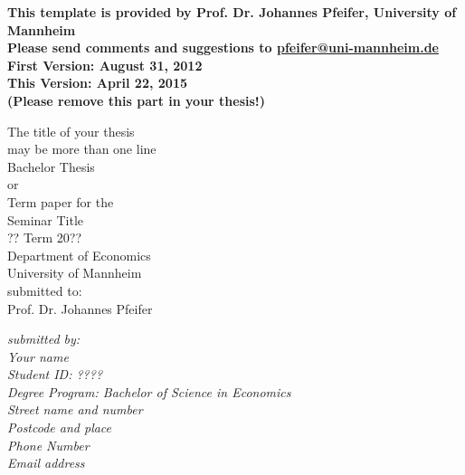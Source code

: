 \documentclass[a4paper,12pt]{scrartcl} %
\begin{document}




\begin{titlepage}

\thispagestyle{empty}   %
\begin{center}
\textbf{
This template is provided by Prof. Dr. Johannes Pfeifer, University of Mannheim\\
Please send comments and suggestions to \href{mailto:pfeifer@uni-mannheim.de}{pfeifer@uni-mannheim.de}\\
First Version: August 31, 2012\\
This Version: April 22, 2015\\
(Please remove this part in your thesis!)
}
\end{center}


\begin{center}
\vspace*{2.cm}
{\textbf  \Large The title of your thesis\\may be more than one line} \\
\vspace*{2cm}
Bachelor Thesis\\
or\\
Term paper for the \\ Seminar Title  \\ ?? Term 20??\\
\vspace{0.5cm}
Department of Economics\\
University of Mannheim\\
\vspace*{0.5cm}
submitted to:\\
Prof. Dr. Johannes Pfeifer\\
\vspace*{0.5cm}

\end{center}


\vfill
\begin{flushright}
   \emph{submitted by:} \\
   \emph{Your name} \\
   \emph{Student ID: ????}\\
    \emph{Degree Program: Bachelor of Science in Economics}\\
   \vspace*{0.5cm}
    \emph{Street name and number}\\
    \emph{Postcode and place}\\
   \emph{Phone Number}\\
   \emph{Email address}\\
\end{flushright}


\end{titlepage}
\end{document}
